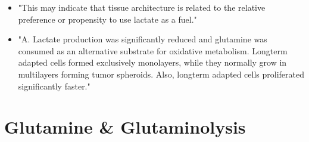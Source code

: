 \documentclass[11pt,a4paper]{article}
\begin{document}
\begin{itemize}
\item "This may indicate that tissue architecture is related to the relative preference or propensity to use lactate as a fuel."\cite{Faubert2017}

 \item"A. Lactate production was significantly reduced and glutamine was consumed as an alternative substrate for oxidative metabolism. Longterm adapted cells formed exclusively monolayers, while they normally grow in multilayers forming tumor spheroids. Also, longterm adapted cells proliferated significantly faster."\cite{Weber2002} 
\end{itemize}

\section{Glutamine \& Glutaminolysis}
\end{document}
